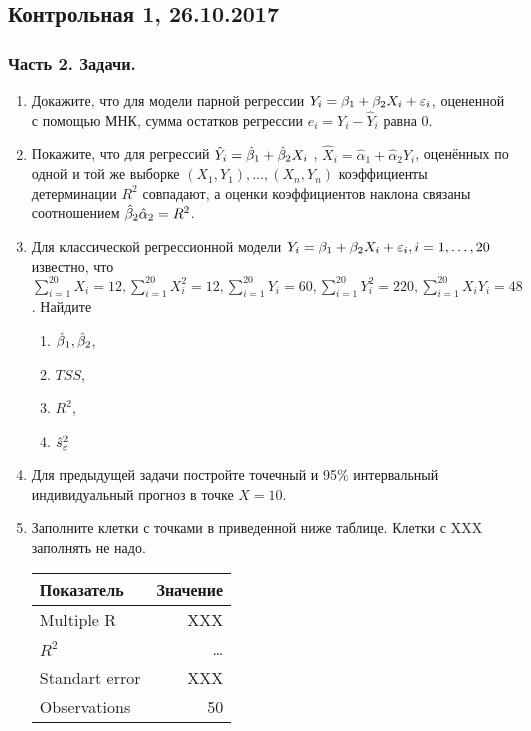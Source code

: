 \subsection{Контрольная 1, 26.10.2017}








\subsubsection*{Часть 2. Задачи.}

\begin{enumerate}

\item Докажите, что для модели парной регрессии  $Y_i = \beta_1 + \beta_2 X_i  + \varepsilon_i$, оцененной с помощью МНК, сумма остатков регрессии  $e_i=Y_i - \hat{Y}_i$ равна 0.

\item Покажите, что для регрессий $\hat{Y}_i= \hat{\beta}_1 + \hat{\beta}_2 X_i$ , $\hat{X}_i = \hat{\alpha}_1 + \hat{\alpha}_2 Y_i$, оценённых по одной и той же выборке $(X_1, Y_1),\ldots, (X_n, Y_n)$ коэффициенты детерминации $R^2$ совпадают, а оценки коэффициентов наклона связаны соотношением $\hat{\beta}_2 \hat{\alpha}_2 = R^2$.

\item Для классической регрессионной модели $Y_i = \beta_1 + \beta_2 X_i + \varepsilon_i , i = 1,\ldots, 20$ известно, что $\sum_{i=1}^{20} X_i = 12, \sum_{i=1}^{20} X_i^2 = 12, \sum_{i=1}^{20} Y_i = 60, \sum_{i=1}^{20} Y_i^2 = 220, \sum_{i=1}^{20} X_i Y_i = 48$. Найдите
\begin{enumerate}
\item $\hat{\beta}_1, \hat{\beta}_2$,
\item $TSS$,
\item $R^2$,
\item $\hat{s}_{\varepsilon}^2$
\end{enumerate}

\item Для предыдущей задачи постройте точечный и 95\% интервальный индивидуальный прогноз в точке $X = 10$.

\item Заполните клетки с точками в приведенной ниже таблице. Клетки с XXX заполнять не надо.

\begin{tabular}{lr} \toprule
Показатель & Значение \\
\midrule
Multiple R          & XXX \\
$R^2$     			& \ldots \\
Standart error 		& XXX \\
Observations		& 50 \\
\bottomrule
\end{tabular}


\end{enumerate}
